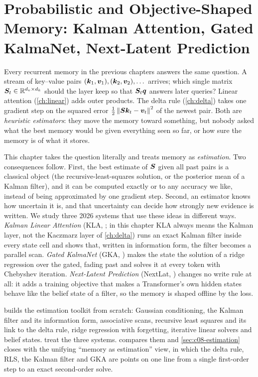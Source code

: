 \chapter{Probabilistic and Objective-Shaped Memory: Kalman Attention, Gated KalmaNet, Next-Latent Prediction}\label{ch:probabilistic}

Every recurrent memory in the previous chapters answers the same question. A stream of
key--value pairs $(\bm{k}_1,\bm{v}_1),(\bm{k}_2,\bm{v}_2),\dots$ arrives; which single matrix
$\bm{S}_t \in \mathbb{R}^{d_v \times d_k}$ should the layer keep so that $\bm{S}_t\bm{q}$ answers later queries?
Linear attention (\cref{ch:linear}) adds outer products. The delta rule (\cref{ch:delta}) takes
one gradient step on the squared error $\tfrac12\left\lVert \bm{S}\bm{k}_t-\bm{v}_t\right\rVert^2$ of the newest pair.
Both are \emph{heuristic estimators}: they move the memory toward something, but nobody asked
what the best memory would be given everything seen so far, or how sure the memory is of what it
stores.

This chapter takes the question literally and treats memory as \emph{estimation}. Two
consequences follow. First, the best estimate of $\bm{S}$ given all past pairs is a classical object
(the recursive-least-squares solution, or the posterior mean of a Kalman filter), and it can be
computed exactly or to any accuracy we like, instead of being approximated by one gradient step.
Second, an estimator knows how uncertain it is, and that uncertainty can decide how strongly new
evidence is written. We study three 2026 systems that use these ideas in different ways.
\emph{Kalman Linear Attention} (KLA, \citet{shaj2026kalman}; in this chapter KLA always means
the Kalman layer, not the Kaczmarz layer of \cref{ch:delta}) runs an exact Kalman filter inside
every state cell and shows that, written in information form, the filter becomes a parallel
scan. \emph{Gated KalmaNet} (GKA, \citet{peng2026gka}) makes the state the solution of a ridge
regression over the gated, fading past and solves it at every token with Chebyshev iteration.
\emph{Next-Latent Prediction} (NextLat, \citet{teoh2026nextlat}) changes no write rule at all: it
adds a training objective that makes a Transformer's own hidden states behave like the belief
state of a filter, so the memory is shaped offline by the loss.

 builds the estimation toolkit from scratch: Gaussian conditioning, the
Kalman filter and its information form, associative scans, recursive least squares and its link
to the delta rule, ridge regression with forgetting, iterative linear solvers and belief states.
 treat the three systems.
 compares them and \cref{sec:c08-estimation} closes with the unifying
``memory as estimation'' view, in which the delta rule, RLS, the Kalman filter and GKA are points
on one line from a single first-order step to an exact second-order solve.

